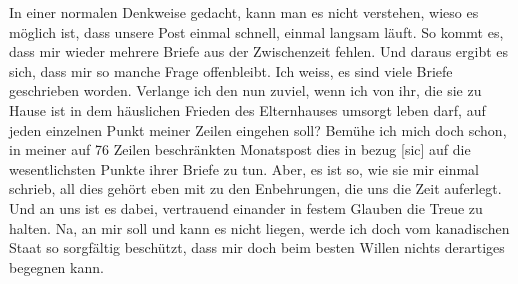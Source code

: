 \def\day{8. Oktober 1942 *}
\mktitle

In einer normalen Denkweise gedacht, kann man es nicht verstehen, wieso es m\"{o}glich ist, dass unsere Post einmal schnell, einmal langsam l\"{a}uft.
So kommt es, dass mir wieder mehrere Briefe aus der Zwischenzeit fehlen.
Und daraus ergibt es sich, dass mir so manche Frage offenbleibt.
Ich weiss, es sind viele Briefe geschrieben worden.
Verlange ich den nun zuviel, wenn ich von ihr, die sie zu Hause ist in dem h\"{a}uslichen Frieden des Elternhauses umsorgt leben darf, auf jeden einzelnen Punkt meiner Zeilen eingehen soll?
Bem\"{u}he ich mich doch schon, in meiner auf 76 Zeilen beschr\"{a}nkten Monatspost dies in bezug {\color{red} [sic] } auf die wesentlichsten Punkte ihrer Briefe zu tun.
Aber, es ist so, wie sie mir einmal schrieb, all dies geh\"{o}rt eben mit zu den Enbehrungen, die uns die Zeit auferlegt.
Und an uns ist es dabei, vertrauend einander in festem Glauben die Treue zu halten.
Na, an mir soll und kann es nicht liegen, werde ich doch vom kanadischen Staat so sorgf\"{a}ltig besch\"{u}tzt, dass mir doch beim besten Willen nichts derartiges begegnen kann.

\clearpage
